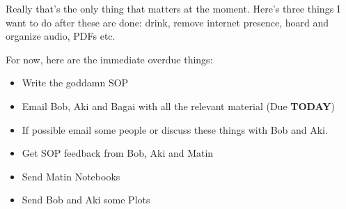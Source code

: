 \noindent {}

Really that's the only thing that matters at the moment. Here's three things I want to do after these are done: drink, remove internet presence, hoard and organize audio, PDFs etc.

For now, here are the immediate overdue things:
\begin{itemize}
    \item Write the goddamn SOP
    \item Email Bob, Aki and Bagai with all the relevant material (Due \textbf{TODAY})
    \item If possible email some people or discuss these things with Bob and Aki. 
    \item Get SOP feedback from Bob, Aki and Matin
    \item Send Matin Notebooks
    \item Send Bob and Aki some Plots
\end{itemize}